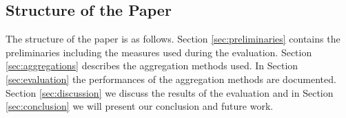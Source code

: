 
\subsection{Structure of the Paper}
The structure of the paper is as follows. Section \ref{sec:preliminaries} contains the preliminaries including the measures used during the evaluation. Section \ref{sec:aggregations} describes the aggregation methods used. In Section \ref{sec:evaluation} the performances of the aggregation methods are documented. Section \ref{sec:discussion} we discuss the results of the evaluation and in Section \ref{sec:conclusion} we will present our conclusion and future work.